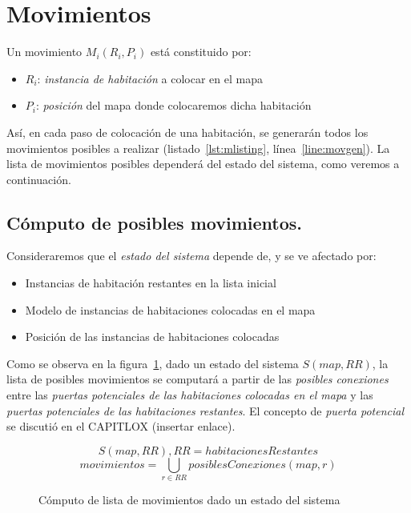 \section{Movimientos}

Un movimiento $M_i(R_i,P_i)$ está constituido por:

\begin{itemize}
	\item$R_i$: \emph{instancia de habitación} a colocar en el mapa
	\item$P_i$: \emph{posición} del mapa donde colocaremos dicha habitación
\end{itemize}

Así, en cada paso de colocación de una habitación, se generarán todos los movimientos posibles a realizar (listado~\ref{lst:mlisting}, línea~\ref{line:movgen}). La lista de movimientos posibles dependerá del estado del sistema, como veremos a continuación.

\subsection{Cómputo de posibles movimientos.}

Consideraremos que el \emph{estado del sistema} depende de, y se ve afectado por:

\begin{itemize}
	\item Instancias de habitación restantes en la lista inicial
	\item Modelo de instancias de habitaciones colocadas en el mapa
	\item Posición de las instancias de habitaciones colocadas
\end{itemize}

Como se observa en la figura~\ref{fig:posmovs}, dado un estado del sistema $S(map,RR)$, la lista de posibles movimientos se computará a partir de las \emph{posibles conexiones} entre las \emph{puertas potenciales de las habitaciones colocadas en el mapa} y las \emph{puertas potenciales de las habitaciones restantes}. El concepto de \emph{puerta potencial} se discutió en el CAPITLOX (insertar enlace).

\begin{figure}[h]
\centering
{
	$$S(map, RR), RR = habitacionesRestantes$$
	$$movimientos = \bigcup_{r \in RR}posiblesConexiones(map, r)$$
}
\caption{Cómputo de lista de movimientos dado un estado del sistema
\label{fig:posmovs}
}
\end{figure}

